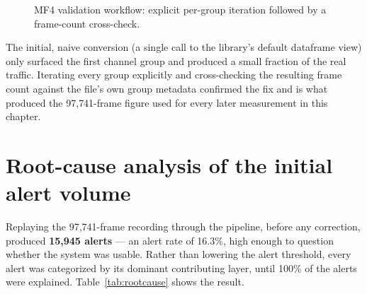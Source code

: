 \begin{figure}[H]
\centering
{}
\caption{MF4 validation workflow: explicit per-group iteration followed by a frame-count cross-check.}
\label{fig:mf4-workflow}
\end{figure}

The initial, naive conversion (a single call to the library's default dataframe view) only surfaced the first channel group and produced a small fraction of the real traffic. Iterating every group explicitly and cross-checking the resulting frame count against the file's own group metadata confirmed the fix and is what produced the 97{,}741-frame figure used for every later measurement in this chapter.

\section{Root-cause analysis of the initial alert volume}
\label{sec:validation-rootcause}

Replaying the 97{,}741-frame recording through the pipeline, before any correction, produced \textbf{15{,}945 alerts} — an alert rate of 16.3\%, high enough to question whether the system was usable. Rather than lowering the alert threshold, every alert was categorized by its dominant contributing layer, until 100\% of the alerts were explained. Table~\ref{tab:rootcause} shows the result.

